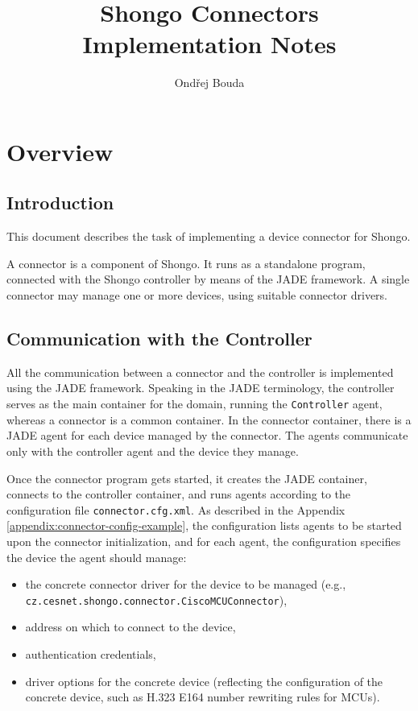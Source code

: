 



\title{Shongo Connectors\\Implementation Notes}
\author{Ondřej Bouda}
\maketitle
\tableofcontents

\chapter{Overview}


\section{Introduction}

This document describes the task of implementing a device connector for Shongo.

A connector is a component of Shongo. It runs as a standalone program, connected with the Shongo controller by means of the JADE framework. A single connector may manage one or more devices, using suitable connector drivers.


\section{Communication with the Controller}

All the communication between a connector and the controller is implemented using the JADE framework. Speaking in the JADE terminology, the controller serves as the main container for the domain, running the \texttt{Controller} agent, whereas a connector is a common container. In the connector container, there is a JADE agent for each device managed by the connector. The agents communicate only with the controller agent and the device they manage.

Once the connector program gets started, it creates the JADE container, connects to the controller container, and runs agents according to the configuration file \texttt{connector.cfg.xml}. As described in the Appendix \ref{appendix:connector-config-example}, the configuration lists agents to be started upon the connector initialization, and for each agent, the configuration specifies the device the agent should manage:
\begin{itemize}
\item the concrete connector driver for the device to be managed (e.g., \\\texttt{cz.cesnet.shongo.connector.CiscoMCUConnector}),
\item address on which to connect to the device,
\item authentication credentials,
\item driver options for the concrete device (reflecting the configuration of the concrete device, such as H.323 E164 number rewriting rules for MCUs).
\end{itemize}

